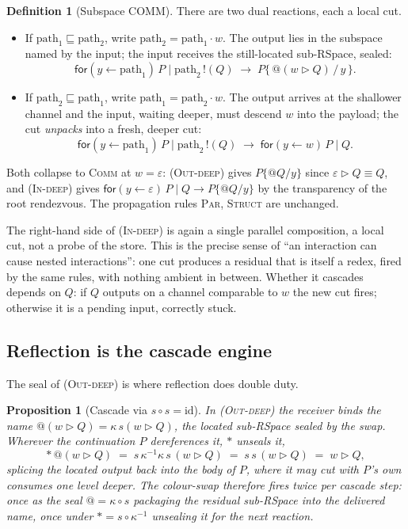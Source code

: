 \documentclass[11pt]{article}
\makeatletter
\theoremstyle{plain}
\newtheorem{proposition}{Proposition}
\theoremstyle{definition}
\newtheorem{definition}{Definition}
\newcommand{\rfor}[2]{\mathsf{for}(#1\!\leftarrow\!#2)\,}
\newcommand{\rout}[2]{#1\,!(#2)}
\newcommand{\loc}{\mathrel{\rhd}}               %
\newcommand{\quo}{@}
\newcommand{\der}{{\ast}}
\newcommand{\eps}{\varepsilon}
\makeatother
\begin{document}
\begin{definition}[Subspace COMM]\label{def:subcomm}
There are two dual reactions, each a local cut.
\begin{itemize}
\item[\textsc{(Out-deep)}] If $\mathrm{path}_1\sqsubseteq\mathrm{path}_2$, write
  $\mathrm{path}_2=\mathrm{path}_1\cdot w$. The output lies in the subspace named by the input; the
  input receives the still-located sub-RSpace, sealed:
  \[
    \rfor{y}{\mathrm{path}_1}P \mid \rout{\mathrm{path}_2}{Q}
    \;\longrightarrow\;
    P\{\,\quo(w\loc Q)\,/\,y\,\}.
  \]
\item[\textsc{(In-deep)}] If $\mathrm{path}_2\sqsubseteq\mathrm{path}_1$, write
  $\mathrm{path}_1=\mathrm{path}_2\cdot w$. The output arrives at the shallower channel and the input,
  waiting deeper, must descend $w$ into the payload; the cut \emph{unpacks} into a fresh, deeper cut:
  \[
    \rfor{y}{\mathrm{path}_1}P \mid \rout{\mathrm{path}_2}{Q}
    \;\longrightarrow\;
    \rfor{y}{w}P \mid Q.
  \]
\end{itemize}
Both collapse to \textsc{Comm} at $w=\eps$: \textsc{(Out-deep)} gives $P\{\quo Q/y\}$ since
$\eps\loc Q\equiv Q$, and \textsc{(In-deep)} gives $\rfor{y}{\eps}P\mid Q\longrightarrow P\{\quo Q/y\}$
by the transparency of the root rendezvous. The propagation rules \textsc{Par}, \textsc{Struct} are
unchanged.
\end{definition}

The right-hand side of \textsc{(In-deep)} is again a single parallel composition, a local cut, not a
probe of the store. This is the precise sense of ``an interaction can cause nested interactions'':
one cut produces a residual that is itself a redex, fired by the same rules, with nothing ambient in
between. Whether it cascades depends on $Q$: if $Q$ outputs on a channel comparable to $w$ the new
cut fires; otherwise it is a pending input, correctly stuck.

\subsection{Reflection is the cascade engine}

The seal of \textsc{(Out-deep)} is where reflection does double duty.

\begin{proposition}[Cascade via $s\circ s=\mathrm{id}$]\label{prop:cascade}
In \textsc{(Out-deep)} the receiver binds the name $\quo(w\loc Q)=\kappa\,s(w\loc Q)$, the located
sub-RSpace sealed by the swap. Wherever the continuation $P$ dereferences it, $\der$ unseals it,
\[
  \der\,\quo(w\loc Q)\;=\;s\,\kappa^{-1}\kappa\,s\,(w\loc Q)\;=\;s\,s\,(w\loc Q)\;=\;w\loc Q,
\]
splicing the located output back into the body of $P$, where it may cut with $P$'s own consumes one
level deeper. The colour-swap therefore fires twice per cascade step: once as the seal
$\quo=\kappa\circ s$ packaging the residual sub-RSpace into the delivered name, once under
$\der=s\circ\kappa^{-1}$ unsealing it for the next reaction.
\end{proposition}
\end{document}
